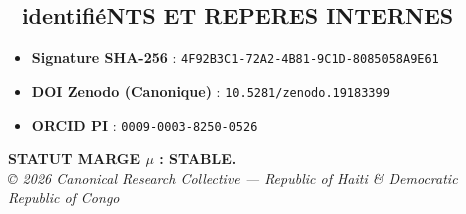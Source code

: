 \documentclass[a4paper,12pt]{article}
\begin{document}
\bigskip



\begin{tcolorbox}[colback=white,colframe=black!75!white]

\section*{📜 identifiéNTS ET REPERES INTERNES}

\begin{itemize}

    \item \textbf{Signature SHA-256} : \texttt{4F92B3C1-72A2-4B81-9C1D-8085058A9E61}

    \item \textbf{DOI Zenodo (Canonique)} : \texttt{10.5281/zenodo.19183399}

    \item \textbf{ORCID PI} : \texttt{0009-0003-8250-0526}

\end{itemize}

\end{tcolorbox}



\vfill

\centering

\textbf{STATUT MARGE $\mu$ : STABLE.} \\

\textit{© 2026 Canonical Research Collective — Republic of Haiti \& Democratic Republic of Congo}
\end{document}
